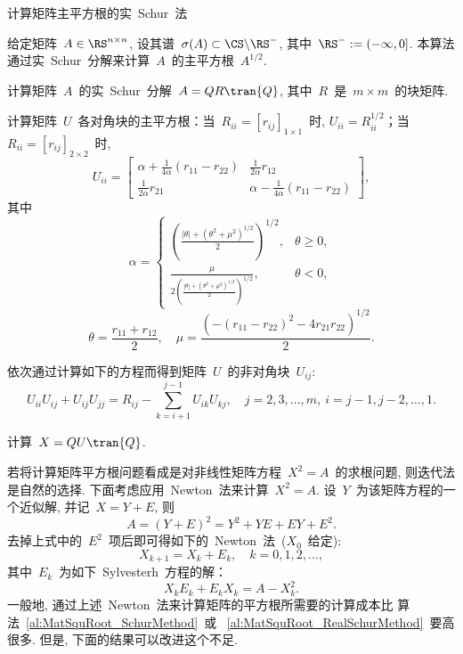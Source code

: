\begin{algorithm}[h!]
\caption{计算矩阵主平方根的实~Schur~法~\cite{Higham1987}}
\label{al:MatSquRoot_RealSchurMethod} 给定矩阵~$A\in\RS^{n\times
n}$, 设其谱~$\sigma(A) \subset \CS\backslash\RS^-$, 其中~$\RS^- :=
(-\infty,0]$.
本算法通过实~Schur~分解来计算~$A$~的主平方根~$A^{1/2}$.
\begin{list}{.}{
\setlength{\rightmargin}{0em}\setlength{\leftmargin}{1.2em}}
\item
计算矩阵~$A$~的实~Schur~分解~$A = QR\tran{Q}$, 其中~$R$~是~$m\times
m$~的块矩阵.
\item
计算矩阵~$U$~各对角块的主平方根：当~$R_{ii}=[r_{ij}]_{1\times1}$~时,
$U_{ii} = R_{ii}^{1/2}$；当~$R_{ii}=[r_{ij}]_{2\times2}$~时,
$$
U_{ii} = \left[\begin{array}{cc} \alpha +
\displaystyle\frac{1}{4\alpha}(r_{11}-r_{22}) &
\displaystyle\frac{1}{2\alpha}r_{12} \\
\displaystyle\frac{1}{2\alpha}r_{21} & \alpha -
\displaystyle\frac{1}{4\alpha}(r_{11}-r_{22})
\end{array}\right],
$$
其中
\begin{equation*}
\alpha = \left\{
\begin{array}{ll}
\displaystyle \left(\frac{|\theta|+(\theta^2 +
\mu^2)^{1/2}}{2}\right)^{1/2}, & \theta \geq 0,\\
\displaystyle
\frac{\mu}{2\left(\displaystyle\frac{|\theta|+(\theta^2 +
\mu^2)^{1/2}}{2}\right)^{1/2}}, & \theta <0,
\end{array}
\right.
\end{equation*}
$$
\theta = \frac{r_{11}+r_{12}}{2},\quad \mu =
\frac{\left(-(r_{11}-r_{22})^2-4r_{21}r_{22}\right)^{1/2}}{2}.
$$
\item
依次通过计算如下的方程而得到矩阵~$U$~的非对角块~$U_{ij}$:
$$
U_{ii}U_{ij} + U_{ij}U_{jj} = R_{ij} - \sum_{k=i+1}^{j-1}
U_{ik}U_{kj}, \quad j = 2,3,\ldots,m,\ i = j-1,j-2,\ldots,1.
$$
\item
计算~$X = QU\tran{Q}$.
\end{list}
\end{algorithm}



若将计算矩阵平方根问题看成是对非线性矩阵方程~$X^2 = A$~的求根问题,
则迭代法是自然的选择. 下面考虑应用~Newton~法来计算~$X^2=A$.
设~$Y$~为该矩阵方程的一个近似解, 并记~$X = Y+E$, 则
$$
A = (Y+E)^2 = Y^2 + YE + EY + E^2.
$$
去掉上式中的~$E^2$~项后即可得如下的~Newton~法~($X_0$~给定):
\begin{equation}
\label{it:NM_MatSquRoot_original} X_{k+1} = X_k + E_k, \quad k = 0,
1, 2, \ldots,
\end{equation}
其中~$E_k$~为如下~Sylvesterh~方程的解：
$$
X_k E_k + E_k X_k = A - X^2_k.
$$
一般地, 通过上述~Newton~法来计算矩阵的平方根所需要的计算成本比
算法~\ref{al:MatSquRoot_SchurMethod}~或
~\ref{al:MatSquRoot_RealSchurMethod}~要高很多. 但是,
下面的结果可以改进这个不足.

